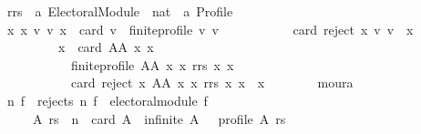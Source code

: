 \begin{isabellebody}
\ \ \ \ \ \ rrs\ {\isacharcolon}{\kern0pt}{\isacharcolon}{\kern0pt}\ {\isachardoublequoteopen}{\isacharparenleft}{\kern0pt}{\isacharprime}{\kern0pt}a\ Electoral{\isacharunderscore}{\kern0pt}Module{\isacharparenright}{\kern0pt}\ {\isasymRightarrow}\ nat\ {\isasymRightarrow}\ {\isacharprime}{\kern0pt}a\ Profile{\isachardoublequoteclose}\ \isanewline
\ \ \ \ \ \ {\isachardoublequoteopen}{\isasymforall}x{}\ x{}{\isachardot}{\kern0pt}\ {\isacharparenleft}{\kern0pt}{\isasymexists}v{}\ v{}{\isachardot}{\kern0pt}\ {\isacharparenleft}{\kern0pt}x{}\ {\isasymle}\ card\ v{}\ {\isasymand}\ finite{\isacharunderscore}{\kern0pt}profile\ v{}\ v{}{\isacharparenright}{\kern0pt}\ {\isasymand}\isanewline
\ \ \ \ \ \ \ \ \ \ card\ {\isacharparenleft}{\kern0pt}reject\ x{}\ v{}\ v{}{\isacharparenright}{\kern0pt}\ {\isasymnoteq}\ x{}{\isacharparenright}{\kern0pt}\ {\isacharequal}{\kern0pt}\isanewline
\ \ \ \ \ \ \ \ \ \ \ \ \ \ {\isacharparenleft}{\kern0pt}{\isacharparenleft}{\kern0pt}x{}\ {\isasymle}\ card\ {\isacharparenleft}{\kern0pt}AA\ x{}\ x{}{\isacharparenright}{\kern0pt}\ {\isasymand}\isanewline
\ \ \ \ \ \ \ \ \ \ \ \ \ \ \ \ finite{\isacharunderscore}{\kern0pt}profile\ {\isacharparenleft}{\kern0pt}AA\ x{}\ x{}{\isacharparenright}{\kern0pt}\ {\isacharparenleft}{\kern0pt}rrs\ x{}\ x{}{\isacharparenright}{\kern0pt}{\isacharparenright}{\kern0pt}\ {\isasymand}\isanewline
\ \ \ \ \ \ \ \ \ \ \ \ \ \ \ \ card\ {\isacharparenleft}{\kern0pt}reject\ x{}\ {\isacharparenleft}{\kern0pt}AA\ x{}\ x{}{\isacharparenright}{\kern0pt}\ {\isacharparenleft}{\kern0pt}rrs\ x{}\ x{}{\isacharparenright}{\kern0pt}{\isacharparenright}{\kern0pt}\ {\isasymnoteq}\ x{}{\isacharparenright}{\kern0pt}{\isachardoublequoteclose}\isanewline
\ \ \ \ \ \ \isamarkupfalse%
\ moura\isanewline
\ \ \ \ \isamarkupfalse%
\isanewline
\ \ \ \ \ \ {\isachardoublequoteopen}{\isasymforall}n\ f{\isachardot}{\kern0pt}\ {\isacharparenleft}{\kern0pt}{\isasymnot}\ rejects\ n\ f\ {\isasymor}\ electoral{\isacharunderscore}{\kern0pt}module\ f\ {\isasymand}\isanewline
\ \ \ \ \ \ \ \ \ \ {\isacharparenleft}{\kern0pt}{\isasymforall}A\ rs{\isachardot}{\kern0pt}\ {\isacharparenleft}{\kern0pt}{\isasymnot}\ n\ {\isasymle}\ card\ A\ {\isasymor}\ infinite\ A\ {\isasymor}\ {\isasymnot}\ profile\ A\ rs{\isacharparenright}{\kern0pt}\ {\isasymor}\isanewline

\end{isabellebody}
